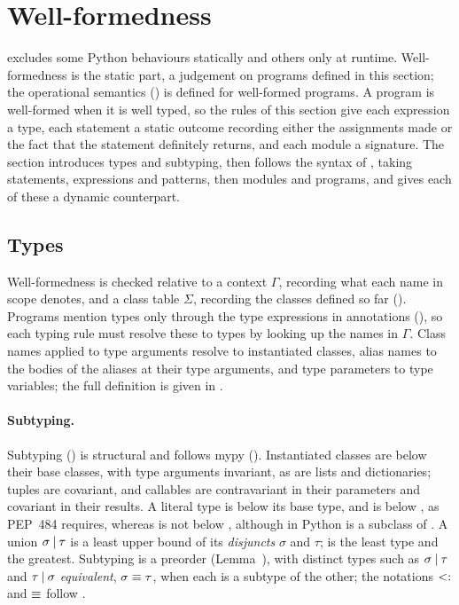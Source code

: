 \section{Well-formedness}
\label{sec:well-formedness}

\PurePy excludes some Python behaviours statically and others only at runtime.
Well-formedness is the static part, a judgement on programs defined in this section; the operational
semantics () is defined for well-formed programs. A program is well-formed
when it is well typed, so the rules of this section give each expression a type, each statement a
static outcome recording either the assignments made or the fact that the statement definitely returns,
and each module a signature. The section introduces
types and subtyping, then follows the syntax of , taking statements, expressions and
patterns, then modules and programs, and  gives each of these a dynamic
counterpart.



\subsection{Types}
\label{sec:types}

Well-formedness is checked relative to a context $\Gamma$, recording what each name in scope denotes, and a
class table $\Sigma$, recording the classes defined so far (). Programs mention types only
through the type expressions in annotations (), so each typing rule must resolve these to
types by looking up the names in $\Gamma$. Class names applied to type arguments resolve to
instantiated classes, alias names to the bodies of the aliases at their type arguments, and type parameters to type
variables; the full definition is given in .

\paragraph{Subtyping.}

Subtyping () is structural and follows mypy (). Instantiated classes are below their base classes, with type arguments invariant, as
are lists and dictionaries; tuples are covariant, and callables are contravariant in their parameters and covariant
in their results. A literal type is below its base type, and  is below , as PEP~484
requires, whereas  is not below , although in Python  is a subclass of . A union $\sigma \mathbin{|} \tau$ is a least upper bound of its \emph{disjuncts} $\sigma$ and $\tau$;  is the least type and
 the greatest. Subtyping is a preorder (Lemma~), with distinct
types such as $\sigma \mathbin{|} \tau$ and $\tau \mathbin{|} \sigma$ \emph{equivalent}, $\sigma \mathrel{\equiv} \tau$, when each
is a subtype of the other; the notations $\mathrel{<:}$ and $\mathrel{\equiv}$ follow \citet{pierce2002}.

